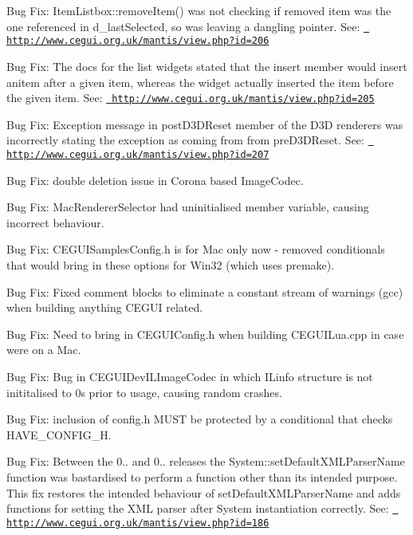 \begin{DoxyItemize}
\item Bug Fix\+: Item\+Listbox\+::remove\+Item() was not checking if removed item was the one referenced in d\+\_\+last\+Selected, so was leaving a dangling pointer. See\+: \href{http://www.cegui.org.uk/mantis/view.php?id=206}{\texttt{ http\+://www.\+cegui.\+org.\+uk/mantis/view.\+php?id=206}}
\item Bug Fix\+: The docs for the list widgets stated that the insert member would insert anitem after a given item, whereas the widget actually inserted the item before the given item. See\+: \href{http://www.cegui.org.uk/mantis/view.php?id=205}{\texttt{ http\+://www.\+cegui.\+org.\+uk/mantis/view.\+php?id=205}}
\item Bug Fix\+: Exception message in post\+D3\+D\+Reset member of the D3D renderers was incorrectly stating the exception as coming from from pre\+D3\+D\+Reset. See\+: \href{http://www.cegui.org.uk/mantis/view.php?id=207}{\texttt{ http\+://www.\+cegui.\+org.\+uk/mantis/view.\+php?id=207}}
\item Bug Fix\+: double deletion issue in Corona based Image\+Codec.
\item Bug Fix\+: Mac\+Renderer\+Selector had uninitialised member variable, causing incorrect behaviour.
\item Bug Fix\+: C\+E\+G\+U\+I\+Samples\+Config.\+h is for Mac only now -\/ removed conditionals that would bring in these options for Win32 (which uses premake).
\item Bug Fix\+: Fixed comment blocks to eliminate a constant stream of warnings (gcc) when building anything C\+E\+G\+UI related.
\item Bug Fix\+: Need to bring in C\+E\+G\+U\+I\+Config.\+h when building C\+E\+G\+U\+I\+Lua.\+cpp in case we\textquotesingle{}re on a Mac.
\item Bug Fix\+: Bug in C\+E\+G\+U\+I\+Dev\+I\+L\+Image\+Codec in which I\+Linfo structure is not inititalised to 0s prior to usage, causing random crashes.
\item Bug Fix\+: inclusion of config.\+h M\+U\+ST be protected by a conditional that checks H\+A\+V\+E\+\_\+\+C\+O\+N\+F\+I\+G\+\_\+H.
\item Bug Fix\+: Between the 0.. and 0.. releases the System\+::set\+Default\+X\+M\+L\+Parser\+Name function was bastardised to perform a function other than its intended purpose. This fix restores the intended behaviour of set\+Default\+X\+M\+L\+Parser\+Name and adds functions for setting the X\+ML parser after System instantiation correctly. See\+: \href{http://www.cegui.org.uk/mantis/view.php?id=186}{\texttt{ http\+://www.\+cegui.\+org.\+uk/mantis/view.\+php?id=186}}

\end{DoxyItemize}

